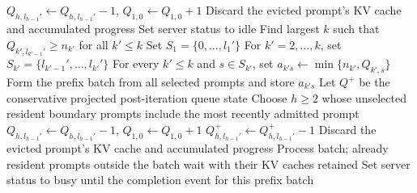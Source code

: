 \begin{breakablealgorithm}
{\begin{algorithmic}[1]
                \State \(Q_{h,l_{h-1}'}\gets Q_{h,l_{h-1}'}-1\), \quad \(Q_{1,0}\gets Q_{1,0}+1\)
                \State Discard the evicted prompt's KV cache and accumulated progress
            \EndWhile
            \State Set server status to idle
        \EndIf
        \State Find largest \( k \) such that \( Q_{k', l_{k'-1}'} \geq n_{k'} \) for all \( k' \leq k \) 
            \State Set \(S_1=\{0,\ldots,l_1'\}\)
            \State For \(k'=2,\ldots,k\), set \(S_{k'}=\{l_{k'-1}',\ldots,l_{k'}'\}\)
            \State For every \(k'\le k\) and \(s\in S_{k'}\), set \(a_{k's}\gets\min\{n_{k'},Q_{k',s}\}\)
            \State Form the prefix batch from all selected prompts and store \(a_{k's}\)
            \State Let \(Q^+\) be the conservative projected post-iteration queue state
                \State Choose \(h\ge2\) whose unselected resident boundary prompts include the most recently admitted prompt
                \State \(Q_{h,l_{h-1}'}\gets Q_{h,l_{h-1}'}-1\), \quad \(Q_{1,0}\gets Q_{1,0}+1\)
                \State \(Q^+_{h,l_{h-1}'}\gets Q^+_{h,l_{h-1}'}-1\)
                \State Discard the evicted prompt's KV cache and accumulated progress
            \EndWhile
            \State Process batch; already resident prompts outside the batch wait with their KV caches retained
            \State Set server status to busy until the completion event for this prefix batch
        \EndIf
    \EndWhile
\end{algorithmic}
}
\end{breakablealgorithm}
